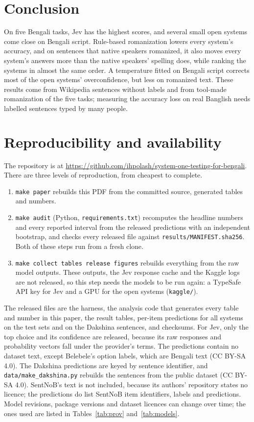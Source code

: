 \documentclass[11pt]{article}
\begin{document}
\section{Conclusion}
On five Bengali tasks, Jev has the highest scores, and several small open systems come close on Bengali script.
Rule-based romanization lowers every system's accuracy, and on sentences that native speakers romanized, it also moves every system's answers more than the native speakers' spelling does, while ranking the systems in almost the same order.
A temperature fitted on Bengali script corrects most of the open systems' overconfidence, but less on romanized text.
These results come from Wikipedia sentences without labels and from tool-made romanization of the five tasks; measuring the accuracy loss on real Banglish needs labelled sentences typed by many people.

\section{Reproducibility and availability}
\label{sec:repro}
The repository is at \url{https://github.com/ihpolash/system-one-testing-for-bengali}.
There are three levels of reproduction, from cheapest to complete.
\begin{enumerate}
\item \texttt{make paper} rebuilds this PDF from the committed source, generated tables and numbers.
\item \texttt{make audit} (Python, \texttt{requirements.txt}) recomputes the headline numbers and every reported interval from the released predictions with an independent bootstrap, and checks every released file against \texttt{results/MANIFEST.sha256}. Both of these steps run from a fresh clone.
\item \texttt{make collect tables release figures} rebuilds everything from the raw model outputs. These outputs, the Jev response cache and the Kaggle logs are not released, so this step needs the models to be run again: a TypeSafe API key for Jev and a GPU for the open systems (\texttt{kaggle/}).
\end{enumerate}
The released files are the harness, the analysis code that generates every table and number in this paper, the result tables, per-item predictions for all systems on the test sets and on the Dakshina sentences, and checksums.
For Jev, only the top choice and its confidence are released, because its raw responses and probability vectors fall under the provider's terms.
The predictions contain no dataset text, except Belebele's option labels, which are Bengali text (CC BY-SA 4.0).
The Dakshina predictions are keyed by sentence identifier, and \texttt{data/make\_dakshina.py} rebuilds the sentences from the public dataset (CC BY-SA 4.0).
SentNoB's text is not included, because its authors' repository states no licence; the predictions do list SentNoB item identifiers, labels and predictions.
Model revisions, package versions and dataset licences can change over time; the ones used are listed in Tables~\ref{tab:prov} and~\ref{tab:models}.
\end{document}
